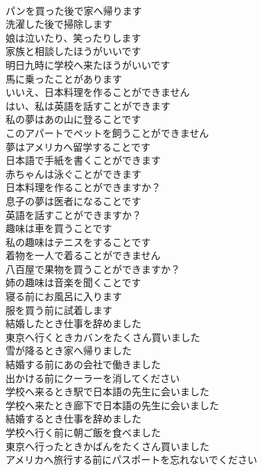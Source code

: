 \documentclass[8pt]{extreport}
\begin{document}
\begin{CJK}{UTF8}{min}
\\	パンを買った後で家へ帰ります	
\\	洗濯した後で掃除します	
\\	娘は泣いたり、笑ったりします	
\\	家族と相談したほうがいいです	
\\	明日九時に学校へ来たほうがいいです	
\\	馬に乗ったことがあります	
\\	いいえ、日本料理を作ることができません	
\\	はい、私は英語を話すことができます	
\\	私の夢はあの山に登ることです	
\\	このアパートでペットを飼うことができません	
\\	夢はアメリカへ留学することです	
\\	日本語で手紙を書くことができます	
\\	赤ちゃんは泳ぐことができます	
\\	日本料理を作ることができますか？	
\\	息子の夢は医者になることです	
\\	英語を話すことができますか？	
\\	趣味は車を買うことです	
\\	私の趣味はテニスをすることです	
\\	着物を一人で着ることができません	
\\	八百屋で果物を買うことができますか？	
\\	姉の趣味は音楽を聞くことです	
\\	寝る前にお風呂に入ります	
\\	服を買う前に試着します	
\\	結婚したとき仕事を辞めました	
\\	東京へ行くときカバンをたくさん買いました	
\\	雪が降るとき家へ帰りました	
\\	結婚する前にあの会社で働きました	
\\	出かける前にクーラーを消してください	
\\	学校へ来るとき駅で日本語の先生に会いました	
\\	学校へ来たとき廊下で日本語の先生に会いました	
\\	結婚するとき仕事を辞めました	
\\	学校へ行く前に朝ご飯を食べました	
\\	東京へ行ったときかばんをたくさん買いました	
\\	アメリカへ旅行する前にパスポートを忘れないでください	

\end{CJK}
\end{document}
